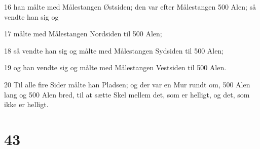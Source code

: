\par 16 han målte med Målestangen Østsiden; den var efter Målestangen 500 Alen; så vendte han sig og
\par 17 målte med Målestangen Nordsiden til 500 Alen;
\par 18 så vendte han sig og målte med Målestangen Sydsiden til 500 Alen;
\par 19 og han vendte sig og målte med Målestangen Vestsiden til 500 Alen.
\par 20 Til alle fire Sider målte han Pladsen; og der var en Mur rundt om, 500 Alen lang og 500 Alen bred, til at sætte Skel mellem det, som er helligt, og det, som ikke er helligt.

\chapter{43}

